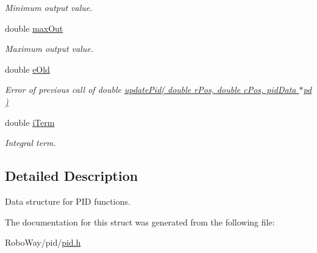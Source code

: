 \begin{DoxyCompactItemize}
\begin{DoxyCompactList}\small\item\em \-Minimum output value. \end{DoxyCompactList}\item 
\hypertarget{structpid_data_a14770bf27f0349e6cb6d407fd23ca3a9}{double \hyperlink{structpid_data_a14770bf27f0349e6cb6d407fd23ca3a9}{max\-Out}}\label{structpid_data_a14770bf27f0349e6cb6d407fd23ca3a9}

\begin{DoxyCompactList}\small\item\em \-Maximum output value. \end{DoxyCompactList}\item 
\hypertarget{structpid_data_abd1a9daaad8dc64103d872c632ac8d35}{double \hyperlink{structpid_data_abd1a9daaad8dc64103d872c632ac8d35}{e\-Old}}\label{structpid_data_abd1a9daaad8dc64103d872c632ac8d35}

\begin{DoxyCompactList}\small\item\em \-Error of previous call of double \hyperlink{pid_8h_a0f7ac4e72e964f94242e0d1f96bb6032}{update\-Pid( double r\-Pos, double c\-Pos, pid\-Data $\ast$pd )} \end{DoxyCompactList}\item 
\hypertarget{structpid_data_aedddf7ade5e4425b4f7fd94fc14134a6}{double \hyperlink{structpid_data_aedddf7ade5e4425b4f7fd94fc14134a6}{i\-Term}}\label{structpid_data_aedddf7ade5e4425b4f7fd94fc14134a6}

\begin{DoxyCompactList}\small\item\em \-Integral term. \end{DoxyCompactList}\end{DoxyCompactItemize}


\subsection{\-Detailed \-Description}
\-Data structure for \-P\-I\-D functions. 

\-The documentation for this struct was generated from the following file\-:\begin{DoxyCompactItemize}
\item 
\-Robo\-Way/pid/\hyperlink{pid_8h}{pid.\-h}\end{DoxyCompactItemize}
